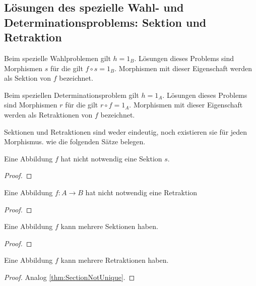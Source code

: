 \documentclass[parskip=half]{scrreprt}
\begin{document}
\subsection{Lösungen des spezielle Wahl- und Determinationsproblems: Sektion und Retraktion}

\begin{definition}
Beim spezielle Wahlproblemen gilt $h = 1_B$.
Lösungen dieses Problems sind Morphismen $s$ für die gilt $f ∘ s = 1_B$. 
Morphismen mit dieser Eigenschaft werden als Sektion von $f$ bezeichnet.
\end{definition}

\begin{definition}[Retraktion]
Beim speziellen Determinationsproblem gilt $h = 1_A$.
Lösungen dieses Problems sind Morphismen $r$ für die gilt $r ∘ f = 1_A$.
Morphismen mit dieser Eigenschaft werden als Retraktionen von $f$ bezeichnet.
\end{definition}

\begin{remark}
Sektionen und Retraktionen sind weder eindeutig, noch existieren sie für jeden 
Morphismus. wie die folgenden Sätze belegen.
\end{remark}

\begin{theorem}\label{thm:SektionNotNecessary}
Eine Abbildung $f$ hat nicht notwendig eine Sektion $s$.
\end{theorem}
\begin{proof}
\end{proof}

\begin{theorem}\label{thm:RetractionNotNecessary}
Eine Abbildung $f: A → B$ hat nicht notwendig eine Retraktion 
\end{theorem}
\begin{proof}
\end{proof}

\begin{theorem}\label{thm:SectionNotUnique}
Eine Abbildung $f$ kann mehrere Sektionen haben.
\end{theorem}
\begin{proof}
\end{proof}

\begin{theorem}\label{thm:RetractionNotUnique}
Eine Abbildung $f$ kann mehrere Retraktionen haben.
\end{theorem}
\begin{proof}
Analog \ref{thm:SectionNotUnique}.
\end{proof}
\end{document}
